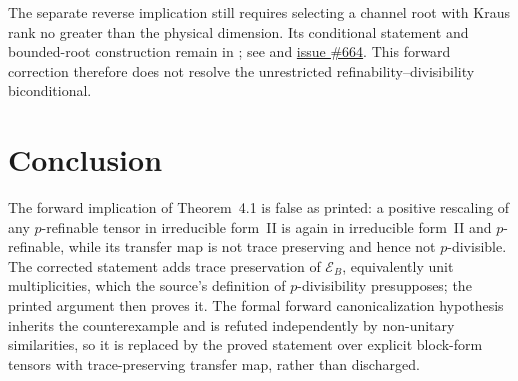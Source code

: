 \documentclass{article}
\begin{document}
The separate reverse implication still requires selecting a channel root
with Kraus rank no greater than the physical dimension. Its conditional
statement and bounded-root construction remain in
; see
 and
\href{https://github.com/LionSR/TNLean/issues/664}{issue \#664}.
This forward correction therefore does not resolve the unrestricted
refinability--divisibility biconditional.

\section{Conclusion}

The forward implication of Theorem~4.1 is false as printed: a positive
rescaling of any $p$-refinable tensor in irreducible form~II is again in
irreducible form~II and $p$-refinable, while its transfer map is not trace
preserving and hence not $p$-divisible. The corrected statement adds trace
preservation of $\mathcal E_B$, equivalently unit multiplicities, which the
source's definition of $p$-divisibility presupposes; the printed argument then
proves it. The formal forward canonicalization hypothesis inherits the
counterexample and is refuted independently by non-unitary similarities, so
it is replaced by the proved statement over explicit block-form tensors
with trace-preserving transfer map, rather than discharged.



\end{document}
